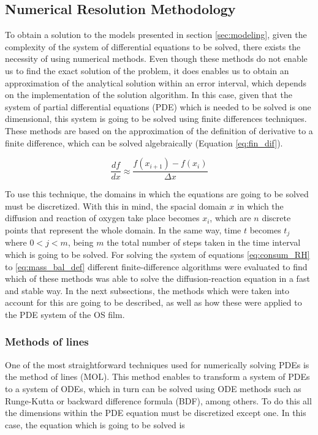 \begin{refsection}
\subsection{Numerical Resolution Methodology}\label{subsec:numerical_methodology.}
To obtain a solution to the models presented in section \ref{sec:modeling}, given the complexity of the system of differential equations to be solved, there exists the necessity of using numerical methods. Even though these methods do not enable us to find the exact solution of the problem, it does enables us to obtain an approximation of the analytical solution within an error interval, which depends on the implementation of the solution algorithm. In this case, given that the system of partial differential equations (PDE) which is needed to be solved is one dimensional, this system is going to be solved using finite differences techniques. These methods are based on the approximation of the definition of derivative to a finite difference, which can be solved algebraically (Equation \ref{eq:fin_dif}).

\begin{equation}
    \frac{df}{dx}\approx \frac{f(x_{i+1})-f(x_{i}) }{\Delta x}
    \label{eq:fin_dif}
\end{equation}

To use this technique, the domains in which the equations are going to be solved must be discretized. With this in mind, the spacial domain $x$ in which the diffusion and reaction of oxygen take place becomes $x_i$, which are $n$ discrete points that represent the whole domain. In the same way, time $t$ becomes $t_j$ where $0<j<m$, being $m$ the total number of steps taken in the time interval which is going to be solved. For solving the  system of equations \ref{eq:consum_RH} to  \ref{eq:mass_bal_def}
different finite-difference algorithms were evaluated to find which of these methods was able to solve the diffusion-reaction equation in a fast and stable way. In the next subsections, the methods which were taken into account for this are going to be described, as well as how these were applied to the PDE system of the OS film. 

\subsubsection{Methods of lines}
One of the most straightforward techniques used for numerically solving PDEs is the method of lines (MOL). This method enables to transform a system of PDEs to a system of ODEs, which in turn can be solved using ODE methods such as Runge-Kutta or backward difference formula (BDF), among others. To do this all the dimensions within the PDE equation must be discretized except one. In this case, the equation which is going to be solved is


\end{refsection}
